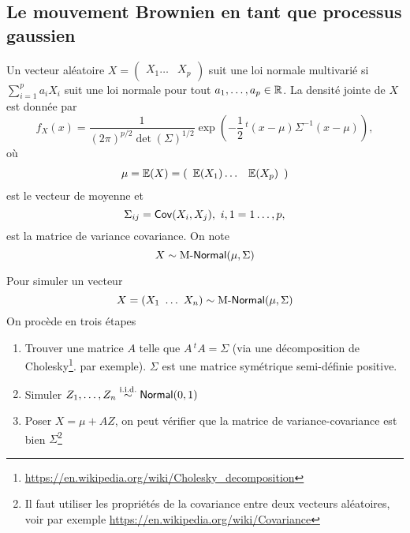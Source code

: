 \subsection{Le mouvement Brownien en tant que processus gaussien}
\begin{definition}
Un vecteur aléatoire $X = (\begin{array}{ccc}X_1\ldots &X_p\end{array})$ suit une loi normale multivarié si $\sum_{i=1}^pa_iX_i$ suit une loi normale pour tout $a_1,\ldots, a_p\in \mathbb{R}$. La densité jointe de $X$ est donnée par 
$$
f_X(x) = \frac{1}{(2\pi)^{p/2}\det(\Sigma)^{1/2}}\exp\left(-\frac{1}{2}\,^t(x-\mu)\Sigma^{-1}(x-\mu)\right),
$$
où
$$
\mu = \mathbb{E}(X) = (\begin{array}{ccc}\mathbb{E}(X_1)\ldots &\mathbb{E}(X_p)\end{array})
$$
est le vecteur de moyenne et 
$$
\Sigma_{ij} =\mathsf{Cov}(X_i, X_j),\text{ }i,1 = 1\ldots, p, 
$$
est la matrice de variance covariance. On note 
$$
X \sim\text{M-}\mathsf{Normal}(\mu,\Sigma)
$$
\end{definition}
\begin{remark}
Pour simuler un vecteur 
$$
X = (X_1\text{ }\ldots\text{ } X_n) \sim\text{M-}\mathsf{Normal}(\mu,\Sigma)
$$
On procède en trois étapes
\begin{enumerate}
  \item Trouver une matrice $A$ telle que $A \,^tA = \Sigma$ (via une décomposition de Cholesky\footnote{\url{https://en.wikipedia.org/wiki/Cholesky_decomposition}}. par exemple). $\Sigma$ est une matrice symétrique semi-définie positive.
  \item Simuler $Z_1,\ldots, Z_n\overset{\text{\iid}}{\sim}\NormalDist(0,1)$
  \item Poser $X = \mu + AZ$, on peut vérifier que la matrice de variance-covariance est bien $\Sigma$\footnote{Il faut utiliser les propriétés de la covariance entre deux vecteurs aléatoires, voir par exemple \url{https://en.wikipedia.org/wiki/Covariance}}
\end{enumerate}
\end{remark}
